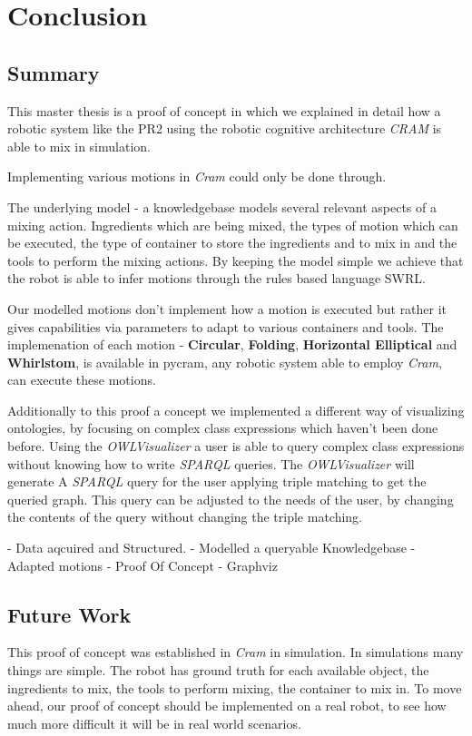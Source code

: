 \chapter{Conclusion}
\label{chap:conclusion}

\section{Summary}
This master thesis is a proof of concept in which we explained in detail how a robotic system like the PR2 
using the robotic cognitive architecture \textit{CRAM} is able to mix in simulation. 

Implementing various motions in \textit{Cram} could only be done through.

The underlying model - a knowledgebase models several relevant aspects of a mixing action. 
Ingredients which are being mixed, the types of motion which can be executed, the type of container to 
store the ingredients and to mix in and the tools to perform the mixing actions. By keeping the model simple we achieve that the robot 
is able to infer motions through the rules based language SWRL. 

Our modelled motions don't implement how a motion is executed but rather it gives capabilities via parameters to adapt 
to various containers and tools. The implemenation of each motion - \textbf{Circular}, \textbf{Folding}, \textbf{Horizontal Elliptical} 
and \textbf{Whirlstom}, is available in pycram, any robotic system able to employ \textit{Cram}, can execute these motions. 

Additionally to this proof a concept we implemented a different way of visualizing ontologies, by focusing 
on complex class expressions which haven't been done before. Using the \textit{OWLVisualizer} a user is able to query 
complex class expressions without knowing how to write \textit{SPARQL} queries. The \textit{OWLVisualizer} will generate A
\textit{SPARQL} query for the user applying triple matching to get the queried graph. This query can be adjusted 
to the needs of the user, by changing the contents of the query without changing the triple matching. 


- Data aqcuired and Structured.
- Modelled a queryable Knowledgebase
- Adapted motions
- Proof Of Concept
- Graphviz
\section{Future Work}
This proof of concept was established in \textit{Cram} in simulation. In simulations many things are simple.
The robot has ground truth for each available object, the ingredients to mix, the tools to perform mixing, the container to mix in. 
To move ahead, our proof of concept should be implemented on a real robot, to see how much more difficult it will 
be in real world scenarios.

